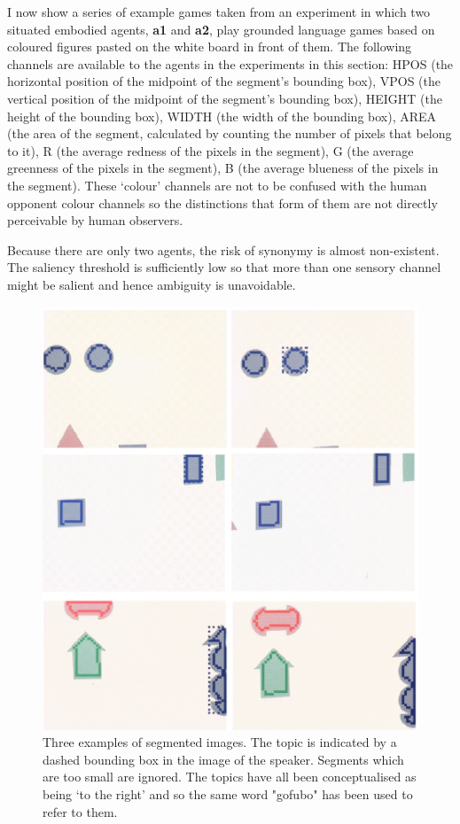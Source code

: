 I now show a series of example games taken from 
an experiment in which two situated embodied agents,
{\bf a1} and {\bf a2}, play grounded language games based on 
coloured figures pasted on the white board in front
of them. The following channels are available to the agents 
in the experiments in this section: 
HPOS (the horizontal position of the midpoint 
of the segment's bounding box), 
VPOS (the vertical position of the midpoint of the segment's 
bounding box), HEIGHT (the height of the bounding box), 
WIDTH (the width of the bounding box), AREA
(the area of the segment, calculated
by counting the number of pixels that belong to it), 
R (the average redness of the pixels in the segment), 
G (the average greenness of the pixels in the segment), 
B (the average blueness of the pixels in the segment). 
These `colour' channels are not to be confused with the 
human opponent colour channels so the distinctions 
that form of them are not directly perceivable by 
human observers.

Because there are only two agents, the 
risk of synonymy is almost non-existent. The saliency 
threshold is sufficiently low so that more than one
sensory channel might be salient and hence ambiguity
is unavoidable. 
\begin{figure}
\begin{center}
\includegraphics[width=0.8\columnwidth]{chap7/figs/plate-10}
\end{center}
\caption{ \footnotesize Three examples of segmented images. The 
topic is indicated by a dashed bounding box in the 
image of the speaker. Segments which are too small 
are ignored. The topics have all been conceptualised
as being `to the right' and so the same word 
"gofubo" has been used to refer to them. }
\label{fig:plate-10}
\end{figure}

